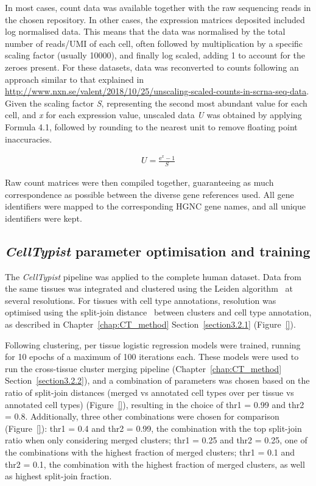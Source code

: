 In most cases, count data was available together with the raw sequencing reads in the chosen repository. In other cases, the expression matrices deposited included log normalised data. This means that the data was normalised by the total number of reads/UMI of each cell, often followed by multiplication by a specific scaling factor (usually 10000), and finally log scaled, adding 1 to account for the zeroes present. For these datasets, data was reconverted to counts following an approach similar to that explained in \url{http://www.nxn.se/valent/2018/10/25/unscaling-scaled-counts-in-scrna-seq-data}. Given the scaling factor \textit{S}, representing the second most abundant value for each cell, and \textit{x} for each expression value, unscaled data \textit{U} was obtained by applying Formula 4.1, followed by rounding to the nearest unit to remove floating point inaccuracies.

\begin{align}
U = \frac{\mathrm{e}^{x} - 1}{S}
\end{align}

Raw count matrices were then compiled together, guaranteeing as much correspondence as possible between the diverse gene references used. All gene identifiers were mapped to the corresponding HGNC gene names, and all unique identifiers were kept.


\subsection{\textit{CellTypist} parameter optimisation and training}
\label{section4.4_model}
The \textit{CellTypist} pipeline was applied to the complete human dataset. Data from the same tissues was integrated and clustered using the Leiden algorithm~\citep{traag_louvain_2019} at several resolutions. For tissues with cell type annotations, resolution was optimised using the split-join distance~\citep{dongen_performance_2000} between clusters and cell type annotation, as described in Chapter~\ref{chap:CT_method} Section~\ref{section3.2.1} (Figure~\ref{}).

Following clustering, per tissue logistic regression models were trained, running for 10 epochs of a maximum of 100 iterations each. These models were used to run the cross-tissue cluster merging pipeline (Chapter~\ref{chap:CT_method} Section~\ref{section3.2.2}), and a combination of parameters was chosen based on the ratio of split-join distances (merged vs annotated cell types over per tissue vs annotated cell types) (Figure~\ref{}), resulting in the choice of thr1 = 0.99 and thr2 = 0.8. Additionally, three other combinations were chosen for comparison (Figure~\ref{}): thr1 = 0.4 and thr2 = 0.99, the combination with the top split-join ratio when only considering merged clusters; thr1 = 0.25 and thr2 = 0.25, one of the combinations with the highest fraction of merged clusters; thr1 = 0.1 and thr2 = 0.1, the combination with the highest fraction of merged clusters, as well as highest split-join fraction.

